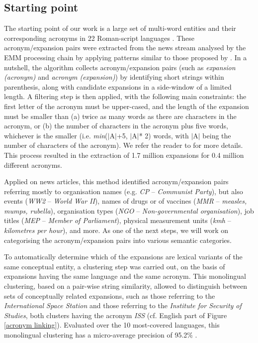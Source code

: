 \documentclass[output=paper]{langsci/langscibook}
\begin{document}
\subsection{Starting point}
\label{starting}

The starting point of our work is a large set of multi-word entities
and their corresponding acronyms in 22 Roman-script languages
\citep{ehrmann-13}. These acronym/expansion pairs were extracted from
the news stream analysed by the EMM processing chain by applying
patterns similar to those proposed by \citet{schwartz-03}. In a
nutshell, the algorithm collects acronym/expansion pairs (such as
\textit{expansion (acronym)} and \textit{acronym (expansion)}) by
identifying short strings within parenthesis, along with candidate
expansions in a side-window of a limited length. A filtering step is
then applied, with the following main constraints: the first letter of
the acronym must be upper-cased, and the length of the expansion must
be smaller than (a) twice as many words as there are characters in the
acronym, or (b) the number of characters in the acronym plus five
words, whichever is the smaller (i.e. \textit{min}($\vert$A$\vert$+5,
$\vert$A$\vert$* 2) words, with $\vert$A$\vert$ being the number of
characters of the acronym). We refer the reader to \citet{schwartz-03}
for more details.  This process resulted in the extraction of 1.7
million expansions for 0.4 million different acronyms.

Applied on news articles, this method identified acronym/expansion
pairs referring mostly to organisation names (e.g.  \textit{CP} –
\textit{Communist Party}), but also events (\textit{WW2} –
\textit{World War II}), names of drugs or of vaccines (\textit{MMR} –
\textit{measles, mumps, rubella}), organisation types (\textit{NGO} –
\textit{Non-governmental organisation}), job titles (\textit{MEP} –
\textit{Member of Parliament}), physical measurement units
(\textit{kmh} – \textit{kilometres per hour}), and more. As one of the
next steps, we will work on categorising the acronym/expansion pairs
into various semantic categories.

To automatically determine which of the expansions are lexical
variants of the same conceptual entity, a clustering step was carried
out, on the basis of expansions having the same language and the same
acronym. This monolingual clustering, based on a pair-wise string
similarity, allowed to distinguish between sets of conceptually
related expansions, such as those referring to the
\textit{International Space Station} and those referring to the
\textit{Institute for Security of Studies}, both clusters having the
acronym \textit{ISS} (cf. English part of Figure \ref{acronym
  linking}).  Evaluated over the 10 most-covered languages, this
monolingual clustering has a micro-average precision of 95.2\%
\citep{jacquet-14}.
\end{document}
